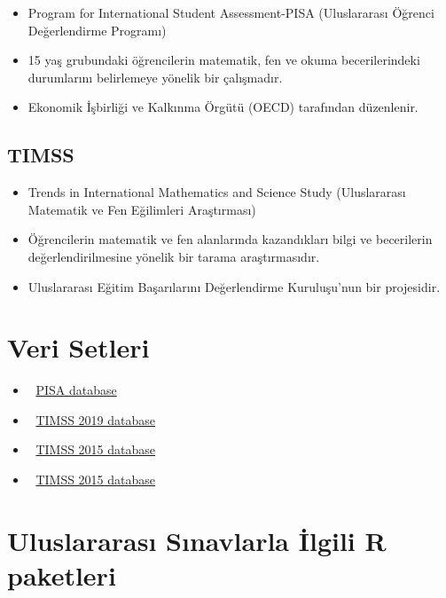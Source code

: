 \documentclass[
  oneside]{book}
\begin{document}
\begin{itemize}
\item
  Program for International Student Assessment-PISA (Uluslararası Öğrenci Değerlendirme Programı)
\item
  15 yaş grubundaki öğrencilerin matematik, fen ve okuma
  becerilerindeki durumlarını belirlemeye yönelik bir çalışmadır.
\item
  Ekonomik İşbirliği ve Kalkınma Örgütü (OECD) tarafından düzenlenir.
\end{itemize}

\hypertarget{timss}{%
\subsection{TIMSS}\label{timss}}

\begin{itemize}
\item
  Trends in International Mathematics and Science Study (Uluslararası Matematik ve Fen Eğilimleri Araştırması)
\item
  Öğrencilerin matematik ve fen alanlarında kazandıkları bilgi ve becerilerin değerlendirilmesine yönelik bir tarama araştırmasıdır.
\item
  Uluslararası Eğitim Başarılarını Değerlendirme Kuruluşu'nun bir projesidir.
\end{itemize}

\hypertarget{veri-setleri-1}{%
\section{Veri Setleri}\label{veri-setleri-1}}

\begin{itemize}
\item
  🔗 \href{https://www.oecd.org/pisa/data/}{PISA database}
\item
  🔗 \href{https://timss2019.org/international-database/}{TIMSS 2019 database}
\item
  🔗 \href{https://timssandpirls.bc.edu/timss2015/international-database/}{TIMSS 2015 database}
\item
  🔗 \href{https://timssandpirls.bc.edu/timss2011/international-database.html}{TIMSS 2015 database}
\end{itemize}

\hypertarget{uluslararasux131-sux131navlarla-ilgili-r-paketleri}{%
\section{Uluslararası Sınavlarla İlgili R paketleri}\label{uluslararasux131-sux131navlarla-ilgili-r-paketleri}}
\end{document}

